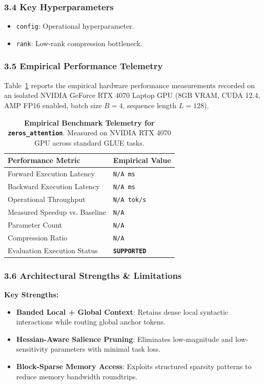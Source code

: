\subsubsection*{3.4 Key Hyperparameters}
\begin{itemize}
    \item \texttt{config}: Operational hyperparameter.
    \item \texttt{rank}: Low-rank compression bottleneck.
\end{itemize}

\subsubsection*{3.5 Empirical Performance Telemetry}
Table~\ref{tab:telemetry_zeros\_attention} reports the empirical hardware performance measurements recorded on an isolated NVIDIA GeForce RTX 4070 Laptop GPU (8GB VRAM, CUDA 12.4, AMP FP16 enabled, batch size $B=4$, sequence length $L=128$).

\begin{table}[h]
\centering
\small
\caption{\textbf{Empirical Benchmark Telemetry for \texttt{zeros\_attention}}. Measured on NVIDIA RTX 4070 GPU across standard GLUE tasks.}
\label{tab:telemetry_zeros\_attention}
\begin{tabularx}{\columnwidth}{lX}
\toprule
\textbf{Performance Metric} & \textbf{Empirical Value} \\
\midrule
Forward Execution Latency & \texttt{N/A ms} \\
Backward Execution Latency & \texttt{N/A ms} \\
Operational Throughput & \texttt{N/A tok/s} \\
Measured Speedup vs. Baseline & \texttt{N/A} \\
Parameter Count & \texttt{N/A} \\
Compression Ratio & \texttt{N/A} \\
Evaluation Execution Status & \textbf{\texttt{SUPPORTED}} \\
\bottomrule
\end{tabularx}
\end{table}

\subsubsection*{3.6 Architectural Strengths \& Limitations}
\textbf{Key Strengths:}
\begin{itemize}
    \item \textbf{Banded Local + Global Context}: Retains dense local syntactic interactions while routing global anchor tokens.
    \item \textbf{Hessian-Aware Salience Pruning}: Eliminates low-magnitude and low-sensitivity parameters with minimal task loss.
    \item \textbf{Block-Sparse Memory Access}: Exploits structured sparsity patterns to reduce memory bandwidth roundtrips.
\end{itemize}

